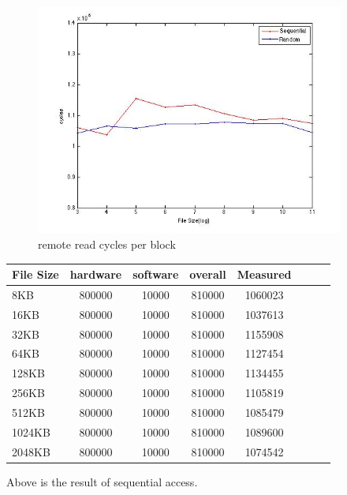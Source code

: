 \begin{figure}[htbp] %
   \centering
   \includegraphics[width=4in]{./pics/43.jpg} 
   \caption{remote read cycles per block}
   \label{fig:remote read cycles per block}
\end{figure}

\begin{center}
\begin{tabular}{l*{6}{c}r}
File Size             &  hardware & software & overall & Measured \\
\hline
8KB & 800000 & 10000 & 810000 & 1060023\\ 
16KB & 800000 & 10000 & 810000 & 1037613\\ 
32KB & 800000 & 10000 & 810000 & 1155908\\
64KB & 800000 & 10000 & 810000 & 1127454\\
128KB & 800000 & 10000 & 810000 & 1134455\\
256KB & 800000 & 10000 & 810000 & 1105819\\
512KB & 800000 & 10000 & 810000 & 1085479\\
1024KB & 800000 & 10000 & 810000 & 1089600\\
2048KB & 800000 & 10000 & 810000 & 1074542\\

\end{tabular}
\end{center}

Above is the result of sequential access.

